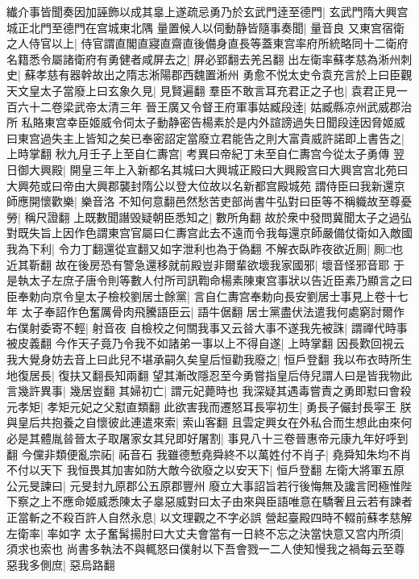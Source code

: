 纎介事皆聞奏因加誣飾以成其辠上遂疏忌勇乃於玄武門逹至德門|{
	玄武門隋大興宫城正北門至德門在宫城東北隅}
量置候人以伺動静皆隨事奏聞|{
	量音良}
又東宫宿衛之人侍官以上|{
	侍官謂直閣直寢直齋直後備身直長等蓋東宫率府所統略同十二衛府}
名籍悉令屬諸衛府有勇健者咸屏去之|{
	屏必郢翻去羌呂翻}
出左衛率蘇孝慈為淅州刺史|{
	蘇孝慈有器幹故出之隋志淅陽郡西魏置淅州}
勇愈不悦太史令袁充言於上曰臣觀天文皇太子當廢上曰玄象久見|{
	見賢遍翻}
羣臣不敢言耳充君正之子也|{
	袁君正見一百六十二卷梁武帝太清三年}
晉王廣又令督王府軍事姑臧段逹|{
	姑臧縣凉州武威郡治所}
私賂東宫幸臣姬威令伺太子動静密告楊素於是内外諠謗過失日聞段逹因脅姬威曰東宫過失主上皆知之矣已奉密詔定當廢立君能告之則大富貴威許諾即上書告之|{
	上時掌翻}
秋九月壬子上至自仁夀宫|{
	考異曰帝紀丁未至自仁夀宫今從太子勇傳}
翌日御大興殿|{
	開皇三年上入新都名其城曰大興城正殿曰大興殿宫曰大興宫宫北苑曰大興苑或曰帝由大興郡襲封隋公以登大位故以名新都宫殿城苑}
謂侍臣曰我新還京師應開懷歡樂|{
	樂音洛}
不知何意翻邑然愁苦吏部尚書牛弘對曰臣等不稱軄故至尊憂勞|{
	稱尺證翻}
上既數聞譖毁疑朝臣悉知之|{
	數所角翻}
故於衆中發問冀聞太子之過弘對既失旨上因作色謂東宫官屬曰仁夀宫此去不遠而令我每還京師嚴備仗衛如入敵國我為下利|{
	令力丁翻還從宣翻又如字泄利也為于偽翻}
不解衣臥昨夜欲近厠|{
	厠□也近其靳翻}
故在後房恐有警急還移就前殿豈非爾輩欲壞我家國邪|{
	壞音怪邪音耶}
于是執太子左庶子唐令則等數人付所司訊鞫命楊素陳東宫事狀以告近臣素乃顯言之曰臣奉勅向京令皇太子檢校劉居士餘黨|{
	言自仁夀宫奉勅向長安劉居士事見上卷十七年}
太子奉詔作色奮厲骨肉飛騰語臣云|{
	語牛倨翻}
居士黨盡伏法遣我何處窮討爾作右僕射委寄不輕|{
	射音夜}
自檢校之何關我事又云㫺大事不遂我先被誅|{
	謂禪代時事被皮義翻}
今作天子竟乃令我不如諸弟一事以上不得自遂|{
	上時掌翻}
因長歎回視云我大覺身妨去音上曰此兒不堪承嗣久矣皇后恒勸我廢之|{
	恒戶登翻}
我以布衣時所生地復居長|{
	復扶又翻長知兩翻}
望其漸改隱忍至今勇嘗指皇后侍兒謂人曰是皆我物此言幾許異事|{
	幾居豈翻}
其婦初亡|{
	謂元妃薨時也}
我深疑其遇毒嘗責之勇即懟曰會殺元孝矩|{
	孝矩元妃之父懟直類翻}
此欲害我而遷怒耳長寜初生|{
	勇長子儼封長寜王}
朕與皇后共抱養之自懷彼此連遣來索|{
	索山客翻}
且雲定興女在外私合而生想此由來何必是其體胤㫺晉太子取屠家女其兒即好屠割|{
	事見八十三卷晉惠帝元康九年好呼到翻}
今儻非類便亂宗祏|{
	祏音石}
我雖德慙堯舜終不以萬姓付不肖子|{
	堯舜知朱均不肖不付以天下}
我恒畏其加害如防大敵今欲廢之以安天下|{
	恒戶登翻}
左衛大將軍五原公元旻諫曰|{
	元旻封九原郡公五原郡豐州}
廢立大事詔旨若行後悔無及讒言罔極惟陛下察之上不應命姬威悉陳太子辠惡威對曰太子由來與臣語唯意在驕奢且云若有諫者正當斬之不殺百許人自然永息|{
	以文理觀之不字必誤}
營起臺殿四時不輟前蘇孝慈解左衛率|{
	率如字}
太子奮髯揚肘曰大丈夫會當有一日終不忘之決當快意又宫内所須|{
	須求也索也}
尚書多執法不與輒怒曰僕射以下吾會戮一二人使知慢我之禍每云至尊惡我多側庶|{
	惡烏路翻}
